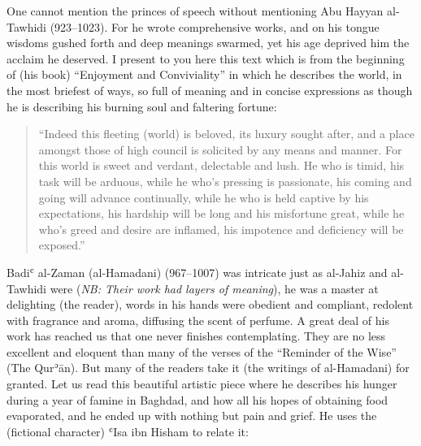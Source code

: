 \documentclass[12pt]{memoir}
\def\´{ʾ} %
\def\`{ʿ} %
\def \Quran{Qur\-\´ān} %
\newcommand{\NB}[1]{\emph{\small NB: #1}}
\begin{document}

One cannot mention the princes of speech without mentioning
Abu Hayyan al-Tawhidi (923–1023).
For he wrote comprehensive works, and on his tongue wisdoms gushed forth
and deep meanings swarmed, yet his age deprived him the acclaim he deserved.
I present to you here this text which is from the beginning of (his book)
“Enjoyment and Conviviality” in which he describes the world,
in the most briefest of ways, so full of meaning and in concise expressions
as though he is describing his burning soul and faltering fortune:

\begin{quote}
“Indeed this fleeting (world) is beloved, its luxury sought after,
and a place amongst those of high council is solicited by any means and manner.
For this world is sweet and verdant, delectable and lush.
He who is timid, his task will be arduous,
while he who’s pressing is passionate,
his coming and going will advance continually,
while he who is held captive by his expectations,
his hardship will be long and his misfortune great,
while he who’s greed and desire are inflamed,
his impotence and deficiency will be exposed.”\footnotemark
\end{quote}


Badi\` al-Zaman (al-Hamadani) (967–1007) was intricate
just as al-Jahiz and al-Tawhidi were
(\NB{Their work had layers of meaning}),
he was a master at delighting (the reader),
words in his hands were obedient and compliant,
redolent with fragrance and aroma, diffusing the scent of perfume.
A great deal of his work has reached us that one never finishes contemplating.
They are no less excellent and eloquent than many of the verses
of the “Reminder of the Wise” (The \Quran).
But many of the readers take it (the writings of al-Hamadani) for granted.
Let us read this beautiful artistic piece where
he describes his hunger during a year of famine in Baghdad,
and how all his hopes of obtaining food evaporated,
and he ended up with nothing but pain and grief.
He uses the (fictional character) \`Isa ibn Hisham to relate it:
\end{document}
